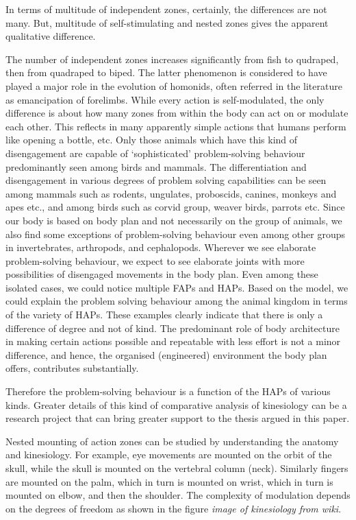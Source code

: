 In terms of multitude of independent zones, certainly, the differences are not many. But, multitude of self-stimulating and nested zones gives the apparent qualitative difference.

The number of independent zones increases significantly from fish to qudraped, then from quadraped to biped. The latter phenomenon is considered to have played a major role in the evolution of homonids, often referred in the literature as emancipation of forelimbs. While every action is self-modulated, the only difference is about how many zones from within the body can act on or modulate each other. This reflects in many apparently simple actions that humans perform like opening a bottle, etc. 
Only those animals which have this kind of disengagement are capable of `sophisticated' problem-solving behaviour predominantly seen among birds and mammals. The differentiation and disengagement in various degrees of problem solving capabilities can be seen among mammals such as rodents, ungulates, proboscids, canines, monkeys and apes etc., and among birds such as corvid group, weaver birds, parrots etc. Since our body is based on body plan and not necessarily on the group of animals, we also find some exceptions of problem-solving behaviour even among other groups in invertebrates, arthropods, and cephalopods. Wherever we see elaborate problem-solving behaviour, we expect to see elaborate joints with more possibilities of disengaged movements in the body plan. Even among these isolated cases, we could notice multiple FAPs and HAPs. Based on the model, we could explain the problem solving behaviour among the animal kingdom in terms of the variety of HAPs.
These examples clearly indicate that there is only a difference of degree and not of kind. The predominant role of body architecture in making certain actions possible and repeatable with less effort is not a minor difference, and hence, the organised (engineered) environment the body plan offers, contributes substantially.

Therefore the problem-solving behaviour is a function of the HAPs of various kinds. Greater details of this kind of comparative analysis of kinesiology can be a research project that can bring greater support to the thesis argued in this paper.

Nested mounting of action zones can be studied by understanding the anatomy and kinesiology. For example, eye movements are mounted on the orbit of the skull, while the skull is mounted on the vertebral column (neck). Similarly fingers are mounted on the palm, which in turn is mounted on wrist, which in turn is mounted on elbow, and then the shoulder. The complexity of modulation depends on the degrees of freedom as shown in the figure\emph{ image of kinesiology from wiki}.

